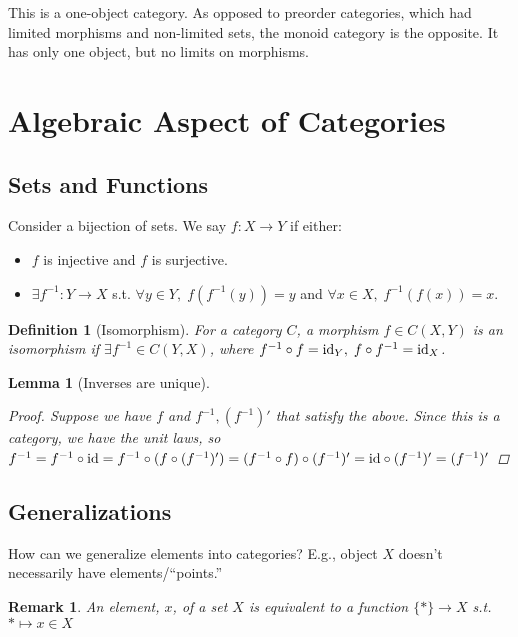 \documentclass[12pt]{article}
\newtheorem{lemma}{Lemma}
\newtheorem{remark}[theorem]{Remark}
\newtheorem{definition}{Definition}
\begin{document}
\vspace{5mm}

This is a one-object category. As opposed to preorder categories, which had limited morphisms and non-limited sets, the monoid category is the opposite. It has only one object, but no limits on morphisms.

\section{Algebraic Aspect of Categories}
\subsection{Sets and Functions}
Consider a bijection of sets. We say $f: X \rightarrow Y$ if either:
\begin{itemize}
    \item $f$ is injective and $f$ is surjective.
    \item $\exists f^{-1}: Y \rightarrow X$ s.t. $\forall y \in Y, \; f(f^{-1}(y)) = y$ and $\forall x \in X, \; f^{-1}(f(x)) = x$.
\end{itemize}
    
\begin{definition}[Isomorphism]
    For a category $C$, a morphism $f \in C(X,Y)$ is an isomorphism if $\exists f^{-1} \in C(Y,X)$, where $f^{-1} \circ f = \textmd{id}_Y, \; f\circ f^{-1} = \textmd{id}_X$.
\end{definition}

\begin{lemma}[Inverses are unique]
    \begin{proof}
        Suppose we have $f$ and $f^{-1},(f^{-1})'$ that satisfy the above. Since this is a category, we have the unit laws, so $f^{-1} =f^{-1} \circ \textmd{id} =f^{-1} \circ (f \circ (f^{-1})') = (f^{-1} \circ f) \circ (f^{-1})' = \textmd{id} \circ (f^{-1})' = (f^{-1})'$
    \end{proof}
\end{lemma}

\subsection{Generalizations}

How can we generalize elements into categories? E.g., object $X$ doesn't necessarily have elements/``points.''

\begin{remark}
    An element, $x$, of a set $X$ is equivalent to a function $\{\ast\} \rightarrow X$ s.t. $\ast \mapsto x \in X$
\end{remark}
\end{document}
